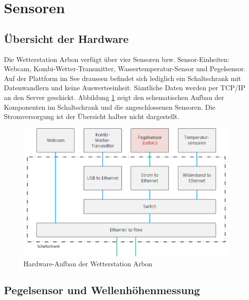 \section{Sensoren}

\subsection{Übersicht der Hardware}
Die Wetterstation Arbon verfügt über vier Sensoren bzw. Sensor-Einheiten: Webcam, Kombi-Wetter-Transmitter, Wassertemperatur-Sensor und Pegelsensor. Auf der Plattform im See draussen befindet sich lediglich ein Schaltschrank mit Datenwandlern und keine Auswerteeinheit. Sämtliche Daten werden per TCP/IP an den Server geschickt. Abbildung \ref{img:schaltschrank} zeigt den schematischen Aufbau der Komponenten im Schaltschrank und die angeschlossenen Sensoren. Die Stromversorgung ist der Übersicht halber nicht dargestellt.

\begin{figure}[h]
	\centering
	\includegraphics[width=0.9\linewidth]{img/schaltschrank.png}
	\caption{Hardware-Aufbau der Wetterstation Arbon}
	\label{img:schaltschrank}
\end{figure}

\subsection{Pegelsensor und Wellenhöhenmessung}

